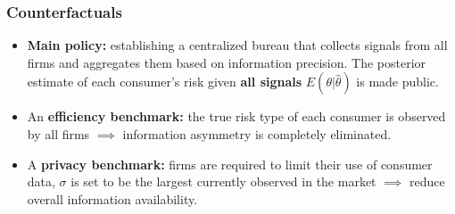 \documentclass[10pt,aspectratio=169]{beamer}
\begin{document}
\begin{frame}
\frametitle{Counterfactuals}
    \begin{itemize}
        \item \textbf{Main policy:} establishing a centralized bureau that collects signals from all firms and aggregates them based on information precision. The posterior estimate of each consumer's risk given \textbf{all signals} $E(\theta|\hat{\theta})$ is made public.
        
        \medskip
        \item An \textbf{efficiency benchmark:} the true risk type of each consumer is observed by all firms $\implies$ information asymmetry is completely eliminated.
        
        \medskip
        \item A \textbf{privacy benchmark:} firms are required to limit their use of consumer data, $\sigma$ is set to be the largest currently observed in the market $\implies$ reduce overall information availability.
    \end{itemize}
\end{frame}
\end{document}
